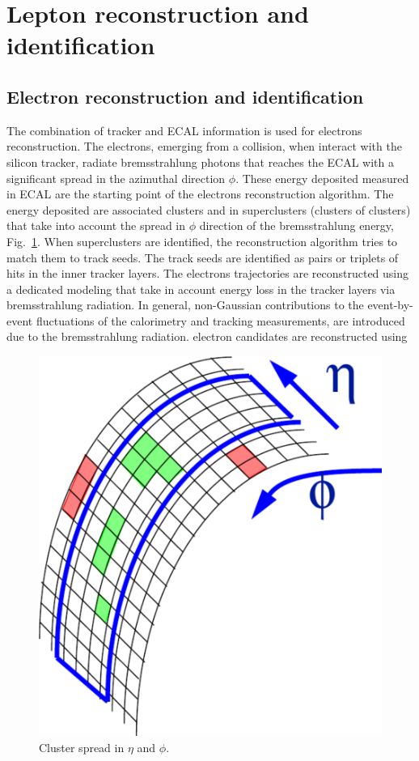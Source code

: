 \section{Lepton reconstruction and identification}
\label{ler}
\subsection*{Electron reconstruction and identification}
The combination of tracker and ECAL information is used for electrons reconstruction.
The electrons, emerging from a collision, when interact with the silicon tracker, radiate bremsstrahlung photons that reaches the ECAL with a significant spread in the azimuthal direction $\phi$. These energy deposited measured in ECAL are the starting point of the electrons reconstruction algorithm. The energy deposited are associated clusters and in superclusters (clusters of clusters) that take into account the spread in  $\phi$ direction of the bremsstrahlung energy, Fig.~\ref{clustering}.
When   superclusters are identified, the reconstruction algorithm tries to match them to track seeds. The  track seeds are identified as pairs or triplets of hits in the inner tracker layers. The electrons trajectories are reconstructed using a dedicated modeling that take in account  energy
loss in the tracker layers via  bremsstrahlung radiation. In general, non-Gaussian contributions to the event-by-event fluctuations 
of the calorimetry and tracking measurements, are introduced due to the  bremsstrahlung radiation.   electron candidates are reconstructed using 
\begin{figure}
\centering
\includegraphics[scale= 0.2]{../Cap4/clustering}
\caption{Cluster spread in $\eta$ and $\phi$.}
\label{clustering}
\end{figure}
